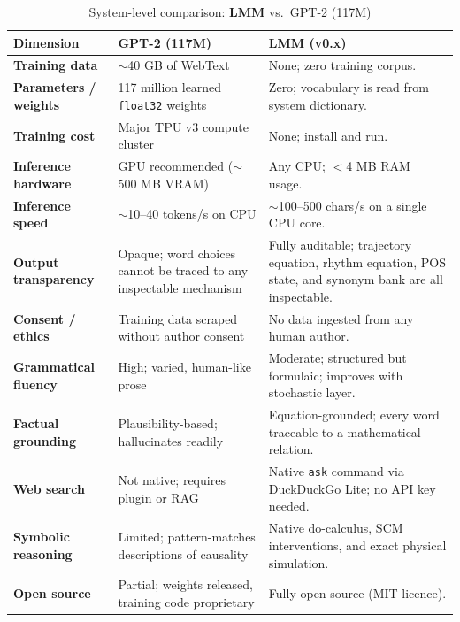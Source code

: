 \documentclass[11pt,a4paper]{article}
\newcommand{\lmm}{\texorpdfstring{%
  \textbf{\color{lmmAccent}LMM}}{LMM}}
\begin{document}
\begin{table}[H]
\centering
\caption{System-level comparison: \lmm{} vs.\ GPT-2 (117M)}
\label{tab:compare}
\renewcommand{\arraystretch}{1.35}
\setlength{\tabcolsep}{6pt}
\begin{tabularx}{\linewidth}{@{}>{\bfseries}p{3.5cm} X X@{}}
\toprule
\rowcolor{lmmHeaderBg}
{\color{white}\textbf{Dimension}} &
{\color{white}\textbf{GPT-2 (117M)}} &
{\color{white}\textbf{LMM (v0.x)}} \\
\midrule
\rowcolor{white}
Training data &
$\sim$40 GB of WebText \citep{radford2019language} &
None; zero training corpus. \\
\rowcolor{lmmRowAlt}
Parameters / weights &
117 million learned \texttt{float32} weights &
Zero; vocabulary is read from system dictionary. \\
\rowcolor{white}
Training cost &
Major TPU v3 compute cluster \citep{radford2019language} &
None; install and run. \\
\rowcolor{lmmRowAlt}
Inference hardware &
GPU recommended ($\sim$500 MB VRAM) &
Any CPU; $<$4 MB RAM usage. \\
\rowcolor{white}
Inference speed &
$\sim$10--40 tokens/s on CPU \citep{llama_cpp} &
$\sim$100--500 chars/s on a single CPU core. \\
\rowcolor{lmmRowAlt}
Output transparency &
Opaque; word choices cannot be traced to any inspectable mechanism &
Fully auditable; trajectory equation, rhythm equation, POS state, and synonym bank are all inspectable. \\
\rowcolor{white}
Consent / ethics &
Training data scraped without author consent \citep{grynbaum2023nyt} &
No data ingested from any human author. \\
\rowcolor{lmmRowAlt}
Grammatical fluency &
High; varied, human-like prose &
Moderate; structured but formulaic; improves with stochastic layer. \\
\rowcolor{white}
Factual grounding &
Plausibility-based; hallucinates readily \citep{bang2023multitask} &
Equation-grounded; every word traceable to a mathematical relation. \\
\rowcolor{lmmRowAlt}
Web search &
Not native; requires plugin or RAG &
Native \texttt{ask} command via DuckDuckGo Lite; no API key needed. \\
\rowcolor{white}
Symbolic reasoning &
Limited; pattern-matches descriptions of causality \citep{kiciman2023causal} &
Native do-calculus, SCM interventions, and exact physical simulation. \\
\rowcolor{lmmRowAlt}
Open source &
Partial; weights released, training code proprietary &
Fully open source (MIT licence). \\
\bottomrule
\end{tabularx}
\end{table}
\end{document}
